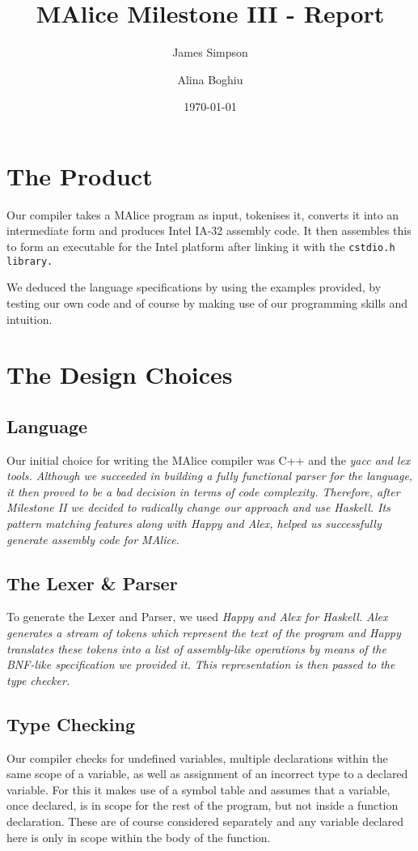 \documentclass[11pt]{article}
\title{MAlice Milestone III - Report}
\author{James Simpson \and Alina Boghiu}
\date{\today}
\begin{document}
\maketitle

\section{The Product}
Our compiler takes a MAlice program as input, tokenises it, converts it into an intermediate form and produces Intel IA-32 assembly code. It then assembles this to form an executable for the Intel platform after linking it with the \tt cstdio.h \rm library.

We deduced the language specifications by using the examples provided, by testing our own code and of course by making use of our programming skills and intuition.

\section{The Design Choices}

\subsection{Language}
Our initial choice for writing the MAlice compiler was C++ and the \sl yacc \rm and \sl lex \rm tools. Although we succeeded in building a fully functional parser for the language, it then proved to be a bad decision in terms of code complexity. Therefore, after Milestone II we decided to radically change our approach and use Haskell. Its pattern matching features along with Happy and Alex, helped us successfully generate assembly code for MAlice.

\subsection{The Lexer \& Parser}
To generate the Lexer and Parser, we used \sl Happy \rm and \sl Alex \rm for Haskell. Alex generates a stream of tokens which represent the text of the program and Happy translates these tokens into a list of assembly-like operations by means of the BNF-like specification we provided it. This representation is then passed to the type checker.

\subsection{Type Checking}
Our compiler checks for undefined variables, multiple declarations within the same scope of a variable, as well as assignment of an incorrect type to a declared variable. For this it makes use of a symbol table and assumes that a variable, once declared, is in scope for the rest of the program, but not inside a function declaration. These are of course considered separately and any variable declared here is only in scope within the body of the function.
\end{document}
